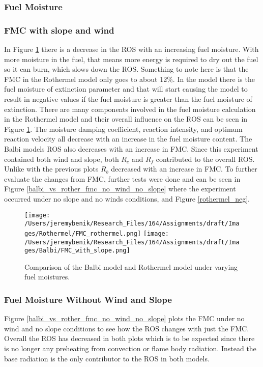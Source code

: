 \documentclass{article}
\begin{document}
\subsubsection{Fuel Moisture}
\subsubsection*{FMC with slope and wind}
\indent In Figure \ref{FMC} there is a decrease in the ROS with an increasing fuel moisture. With more moisture in the fuel, that means more energy is required to dry out the fuel so it can burn, which slows down the ROS. Something to note here is that the FMC in the Rothermel model only goes to about 12\%. In the model there is the fuel moisture of extinction parameter and that will start causing the model to result in negative values if the fuel moisture is greater than the fuel moisture of extinction. There are many components involved in the fuel moisture calculation in the Rothermel model and their overall influence on the ROS can be seen in Figure \ref{FMC}. The moisture damping coefficient, reaction intensity, and optimum reaction velocity all decrease with an increase in the fuel moisture content. The Balbi models ROS also decreases with an increase in FMC. Since this experiment contained both wind and slope, both $R_c$ and $R_f$ contributed to the overall ROS. Unlike with the previous plots $R_b$ decreased with an increase in FMC. To further evaluate the changes from FMC, further tests were done and can be seen in Figure \ref{balbi_vs_rother_fmc_no_wind_no_slope} where the experiment occurred under no slope and no winds conditions, and Figure \ref{rothermel_neg}. \\
\newpage
\begin{figure}[!h]
\centering
  \texttt{[image: /Users/jeremybenik/Research\_Files/164/Assignments/draft/Images/Rothermel/FMC\_rothermel.png]}
  \texttt{[image: /Users/jeremybenik/Research\_Files/164/Assignments/draft/Images/Balbi/FMC\_with\_slope.png]}
  \caption{Comparison of the Balbi model and Rothermel model under varying fuel moistures.}
  \label{FMC}
\end{figure}
\subsubsection*{Fuel Moisture Without Wind and Slope}
\indent Figure \ref{balbi_vs_rother_fmc_no_wind_no_slope} plots the FMC under no wind and no slope conditions to see how the ROS changes with just the FMC. Overall the ROS has decreased in both plots which is to be expected since there is no longer any preheating from convection or flame body radiation. Instead the base radiation is the only contributor to the ROS in both models.
\newpage
\end{document}
